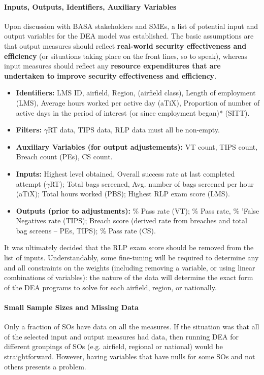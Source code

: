 \paragraph{Inputs, Outputs, Identifiers, Auxiliary Variables}
Upon discussion with BASA stakeholders and SMEs, a list of potential input and output variables for the DEA model was established. 
\newpage\noindent The basic assumptions are that output measures should reflect \textbf{real-world security effectiveness and efficiency} (or situations taking place on the front lines, so to speak), whereas input measures should reflect any \textbf{resource expenditures that are undertaken to improve security effectiveness and efficiency}. 
\begin{itemize}[noitemsep]
\item\textbf{Identifiers:} LMS ID, airfield, Region, (airfield class), Length of employment (LMS), Average hours worked per active day (aTiX), Proportion of number of active days in the period of interest (or since employment began)* (SITT). 
\item\textbf{Filters:} $\gamma$RT data, TIPS data, RLP data must all be non-empty.
\item\textbf{Auxiliary Variables (for output adjustements):} VT count, TIPS count, Breach count (PEs), CS count.
\item\textbf{Inputs:} Highest level obtained, Overall success rate at last completed attempt ($\gamma$RT);
Total bags screened, Avg. number of bags screened per hour (aTiX); Total hours worked (PBS); Highest RLP exam score (LMS).
\item\textbf{Outputs (prior to adjustments):} \% Pass rate (VT); \% Pass rate, \% 'False Negatives rate (TIPS); Breach score (derived rate from breaches and total bag screens -- PEs, TIPS); \% Pass rate (CS).
\end{itemize}
It was ultimately decided that the RLP exam score should be removed from the list of inputs. Understandably, some fine-tuning will be required to determine any and all constraints on the weights (including removing a variable, or using linear combinations of variables): the nature of the data will determine the exact form of the DEA programs to solve for each airfield, region, or nationally.   
\paragraph{Small Sample Sizes and Missing Data}
Only a fraction of SOs have data on all the measures. If the situation was that all of the selected input and output measures had data, then running DEA for different groupings of SOs (e.g. airfield, regional or national) would be straightforward.  However, having variables that have nulls for some SOs and not others presents a problem.  

